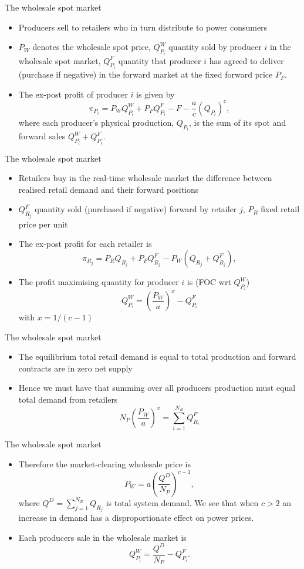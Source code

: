 {The wholesale spot market}
\begin{itemize}
\item<1-> Producers sell to retailers who in turn distribute to power consumers
\item<2-> $P_W$ denotes the wholesale spot price, $Q_{P_i}^W$ quantity sold by producer $i$ in the wholesale spot market, $Q_{P_i}^F$ quantity
that producer $i$ has agreed to deliver (purchase if negative) in the forward market at the fixed forward price $P_F$.
\item<3-> The ex-post profit of producer $i$ is given by
$$
\pi_{P_i}=P_W Q_{P_i}^W + P_FQ_{P_i}^F
-F-\frac{a}{c}(Q_{P_i})^c,$$
where each producer's physical production, $Q_{P_i}$, is the sum of its spot and forward sales $Q_{P_i}^W+Q_{P_i}^F$.
\end{itemize}

{The wholesale spot market}
\begin{itemize}
\item<1-> Retailers buy in the real-time wholesale market the difference between realised retail demand and their forward positions
\item<2-> $Q_{R_j}^F$ quantity sold (purchased if negative) forward by retailer $j$, $P_R$ fixed retail price per unit
\item<3-> The ex-post profit for each retailer is
$$
\pi_{R_j}=P_R Q_{R_j} + P_FQ_{R_j}^F - P_W (Q_{R_j}+Q_{R_j}^F),$$
\item<4-> The profit maximising quantity for producer $i$ is (FOC wrt $Q_{P_i}^W$)
$$Q_{P_i}^W=\left(\frac{P_W}{a}\right)^{x}-Q_{P_i}^F$$
with $x=1/(c-1)$
\end{itemize}

{The wholesale spot market}
\begin{itemize}
\item<1-> The equilibrium total retail demand is equal to total production and forward contracts are in zero net supply
\item<2-> Hence we must have that summing over all producers production must equal total demand from retailers
$$
N_P\left(\frac{P_W}{a}\right)^{x}=\sum_{i=1}^{N_R}Q_{R_i}^F
$$
\end{itemize}

{The wholesale spot market}
\begin{itemize}
\item<1-> Therefore the market-clearing wholesale price is
$$
P_W=a \left(\frac{Q^D}{N_P}\right)^{c-1},$$
where $Q^D=\sum_{j=1}^{N_R}Q_{R_j}$ is total system demand. We see that when $c>2$ an increase in demand has a disproportionate effect on power prices.
\item<2-> Each producers sale in the wholesale market is
$$
Q_{P_i}^W= \frac{Q^D}{N_P}-Q_{P_i}^F.
$$
\end{itemize}

